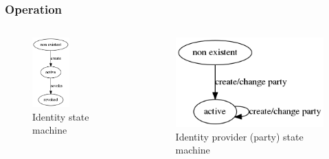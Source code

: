 \documentclass[8pt]{beamer}
\begin{document}
\begin{frame}[fragile]
\frametitle{Operation}
\begin{columns}
\begin{column}{0.3\textwidth}
\begin{figure}
 \includegraphics[width=0.5\textwidth]{identity_state.png}
 \caption{Identity state machine}
\end{figure}

\end{column}
\begin{column}{0.3\textwidth}
\begin{figure}
 \includegraphics[width=1\textwidth]{party_state.png}
 \caption{Identity provider (party) state machine}
\end{figure}
\end{column}
\end{columns}


\end{frame}
\end{document}
